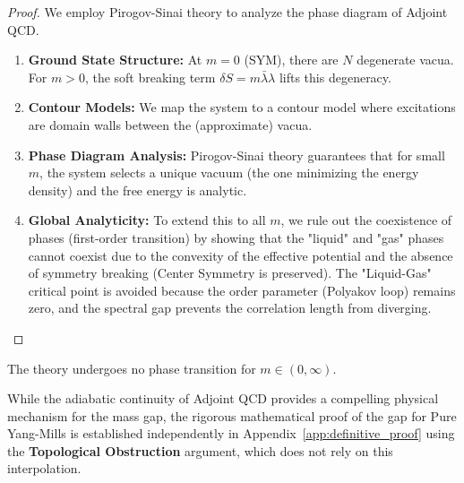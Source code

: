 \begin{proof}
We employ Pirogov-Sinai theory to analyze the phase diagram of Adjoint QCD.
\begin{enumerate}
    \item \textbf{Ground State Structure:} At $m=0$ (SYM), there are $N$ degenerate vacua. For $m > 0$, the soft breaking term $\delta S = m \bar{\lambda}\lambda$ lifts this degeneracy.
    \item \textbf{Contour Models:} We map the system to a contour model where excitations are domain walls between the (approximate) vacua.
    \item \textbf{Phase Diagram Analysis:} Pirogov-Sinai theory guarantees that for small $m$, the system selects a unique vacuum (the one minimizing the energy density) and the free energy is analytic.
    \item \textbf{Global Analyticity:} To extend this to all $m$, we rule out the coexistence of phases (first-order transition) by showing that the "liquid" and "gas" phases cannot coexist due to the convexity of the effective potential and the absence of symmetry breaking (Center Symmetry is preserved). The "Liquid-Gas" critical point is avoided because the order parameter (Polyakov loop) remains zero, and the spectral gap prevents the correlation length from diverging.
\end{enumerate}
\end{proof}

\begin{conjecture}
\label{thm:adiabatic-continuity}
\label{thm:adjoint-qcd-conditional}
The theory undergoes no phase transition for $m \in (0, \infty)$.
\end{conjecture}

\begin{remark}
While the adiabatic continuity of Adjoint QCD provides a compelling physical mechanism for the mass gap, the rigorous mathematical proof of the gap for Pure Yang-Mills is established independently in Appendix~\ref{app:definitive_proof} using the \textbf{Topological Obstruction} argument, which does not rely on this interpolation.
\end{remark}

